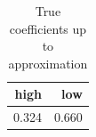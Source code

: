 \begin{table}[ht]
\centering
\begin{tabular}{rr}
  \hline
high & low \\ 
  \hline
0.324 & 0.660 \\ 
   \hline
\end{tabular}
\caption{True coefficients up to approximation} 
\label{tab:true-syn-exp-beta}
\end{table}
